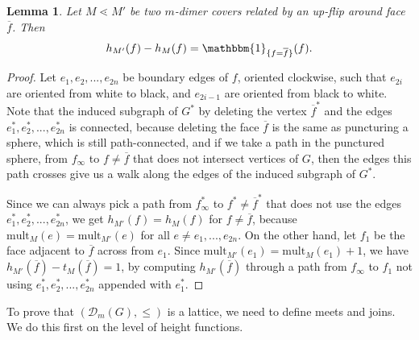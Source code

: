 \documentclass[11pt]{amsart}
\newtheorem{lem}[thm]{Lemma}
\theoremstyle{definition}
\theoremstyle{remark}
\numberwithin{equation}{section}
\begin{document}
\begin{lem}\label{lem:height_diff}
    Let $M\lessdot M'$ be two $m$-dimer covers related by an up-flip around face $\overline{f}$. Then \[h_{M'}(f) - h_{M}(f) = \mathbbm{1}_{\{f=\overline{f}\}}(f).\]
\end{lem}
\begin{proof}
    Let $e_1,e_2,...,e_{2n}$ be boundary edges of $f$, oriented clockwise, such that $e_{2i}$ are oriented from white to black, and $e_{2i-1}$ are oriented from black to white. Note that the induced subgraph of $G^*$ by deleting the vertex $\overline{f}^*$ and the edges $e^*_1,e^*_2,...,e^*_{2n}$ is connected, because deleting the face $\overline{f}$ is the same as puncturing a sphere, which is still path-connected, and if we take a path in the punctured sphere, from  $f_{\infty}$ to $f\neq \overline{f}$ that does not intersect vertices of $G$, then the edges this path crosses give us a walk along the edges of the induced subgraph of $G^*$.

    Since we can always pick a path from $f_{\infty}^*$ to $f^*\neq \overline{f}^*$ that does not use the edges $e^*_1,e^*_2,...,e^*_{2n}$, we get $h_{M'}(f) =h_{M}(f)$ for $f\neq \overline{f}$, because $\text{mult}_M(e) = \text{mult}_{M'}(e)$ for all $e\neq e_1,...,e_{2n}$. On the other hand, let $f_1$ be the face adjacent to $\overline{f}$ across from $e_1$. Since $\text{mult}_{M'}(e_{1}) = \text{mult}_{M}(e_{1})+1$, we have $h_{M'}(\overline{f}) -t_{M}(\overline{f}) = 1$, by computing $h_{M'}(\overline{f})$ through a path from $f_{\infty}$ to $f_1$ not using $e^*_1,e^*_2,...,e^*_{2n}$ appended with $e^*_1$.
\end{proof}

To prove that $(\mathcal{D}_m(G),\leq)$ is a lattice, we need to define meets and joins. We do this first on the level of height functions.
\end{document}
